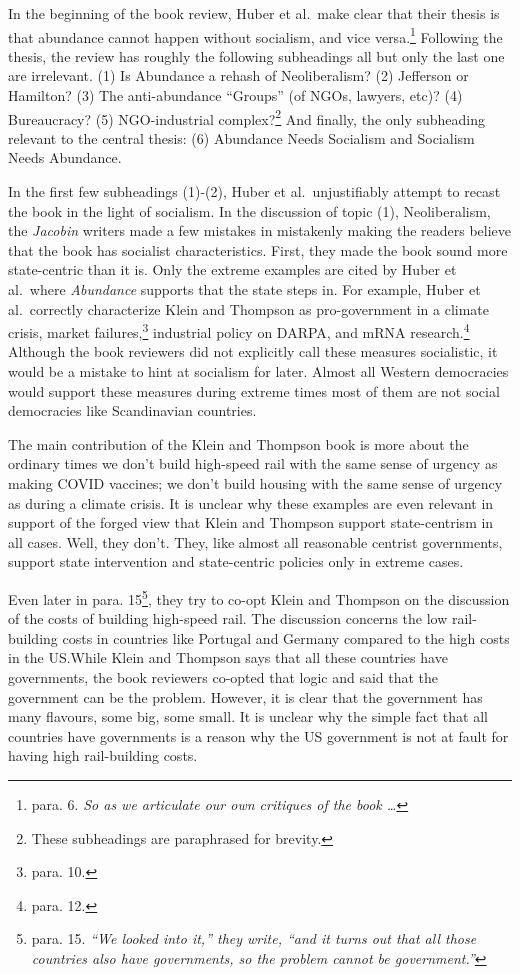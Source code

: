 \documentclass[12pt]{article}
\begin{document}
In the beginning of the book review, Huber et al.\ make clear that their thesis is that abundance cannot happen without socialism, and vice versa.\footnote{para. 6. \textit{So as we articulate our own critiques of the book \dots}} Following the thesis, the review has roughly the following subheadings\textemdash{} all but only the last one are irrelevant. (1) Is Abundance a rehash of Neoliberalism? (2) Jefferson or Hamilton? (3) The anti-abundance ``Groups'' (of NGOs, lawyers, etc)? (4) Bureaucracy? (5) NGO-industrial complex?\footnote{These subheadings are paraphrased for brevity.} And finally, the only subheading relevant to the central thesis: (6) Abundance Needs Socialism and Socialism Needs Abundance.

In the first few subheadings (1)-(2), Huber et al.\ unjustifiably attempt to recast the book in the light of socialism. In the discussion of topic (1), Neoliberalism, the \textit{Jacobin} writers made a few mistakes in mistakenly making the readers believe that the book has socialist characteristics. First, they made the book sound more state-centric than it is. Only the extreme examples are cited by Huber et al.\ where \textit{Abundance} supports that the state steps in. For example, Huber et al.\ correctly characterize Klein and Thompson as pro-government in a climate crisis, market failures,\footnote{para. 10.} industrial policy on DARPA, and mRNA research.\footnote{para. 12.} Although the book reviewers did not explicitly call these measures socialistic, it would be a mistake to hint at socialism for later. Almost all Western democracies would support these measures during extreme times\textemdash{} most of them are not social democracies like Scandinavian countries. 

The main contribution of the Klein and Thompson book is more about the ordinary times\textemdash{} we don't build high-speed rail with the same sense of urgency as making COVID vaccines; we don't build housing with the same sense of urgency as during a climate crisis. It is unclear why these examples are even relevant in support of the forged view that Klein and Thompson support state-centrism in all cases. Well, they don't. They, like almost all reasonable centrist governments, support state intervention and state-centric policies only in extreme cases.

Even later in para. 15\footnote{para. 15. \textit{``We looked into it,'' they write, ``and it turns out that all those countries also have governments, so the problem cannot be government.''}}, they try to co-opt Klein and Thompson on the discussion of the costs of building high-speed rail. The discussion concerns the low rail-building costs in countries like Portugal and Germany compared to the high costs in the US.\@ While Klein and Thompson says that all these countries have governments, the book reviewers co-opted that logic and said that the government can be the problem. However, it is clear that the government has many flavours, some big, some small. It is unclear why the simple fact that all countries have governments is a reason why the US government is not at fault for having high rail-building costs.
\end{document}

